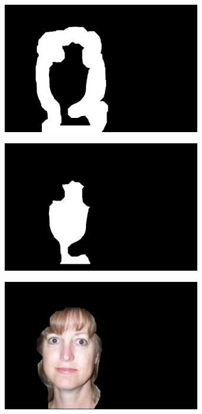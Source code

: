 \begin{figure}[H]
\begin{subfigure}{.24\textwidth}
  \centering
  \includegraphics[width=0.95\textwidth]{img/fd/FilteredFaceMask4.png}
  \caption{}
\end{subfigure}
\begin{subfigure}{.24\textwidth}
  \centering
  \includegraphics[width=0.95\textwidth]{img/fd/FilteredFaceMask5.png}
  \caption{}
\end{subfigure}
\begin{subfigure}{.24\textwidth}
  \centering
  \includegraphics[width=0.95\textwidth]{img/fd/FilteredFaceMask6_Face.png}

\end{subfigure}
\end{figure}
